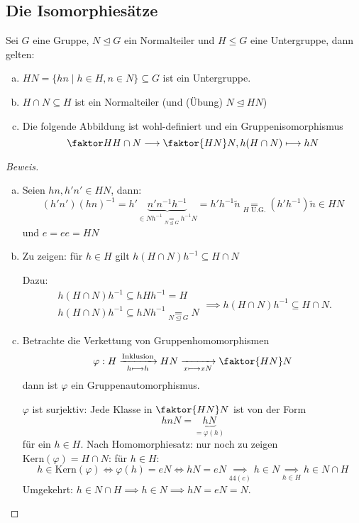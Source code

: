 \documentclass[a4paper]{report}
\begin{document}
\subsection*{Die Isomorphiesätze}
\begin{satz}
  Sei $G$ eine Gruppe, $N \trianglelefteq G$ ein Normalteiler und $H \le G$ eine Untergruppe, dann gelten:
  \begin{enumerate}[(a)]
    \item $HN = \{hn \mid h \in H, n \in N\} \subseteq G$ ist ein Untergruppe.
    \item $H \cap N \subseteq H$ ist ein Normalteiler (und (Übung) $N \trianglelefteq HN$)
    \item Die folgende Abbildung ist wohl-definiert und ein Gruppenisomorphismus $$\faktor H{H \cap N} \longrightarrow \faktor {HN}N, h(H\cap N) \longmapsto hN$$
  \end{enumerate}
\begin{proof}[Beweis]
\begin{enumerate}[(a)]
  \item Seien $hn, h'n' \in HN$, dann:
        $$(h'n')(hn)^{-1}=h'\underbrace{n'n^{-1}h^{-1}}_{\in Nh^{-1} \underset{N \trianglelefteq G} = h^{-1}N} = h'h^{-1}\tilde n \underset{H \text{ U.G.}}= (h'h^{-1})\tilde n \in HN$$
        und $e = ee = HN$
  \item Zu zeigen: für $h \in H$ gilt $h(H \cap N)h^{-1} \subseteq H \cap N$

        Dazu:
        $$\begin{matrix}
            h (H \cap N)h^{-1} \subseteq hHh^{-1} = H \\
            h (H \cap N)h^{-1} \subseteq hNh^{-1} \underset{N \trianglelefteq G}= N
          \end{matrix} \implies h(H \cap N)h^{-1} \subseteq H \cap N.$$

  \item Betrachte die Verkettung von Gruppenhomomorphismen
        $$\varphi: H \xrightarrow[h \longmapsto h]{\text{Inklusion}} HN \xrightarrow[x \longmapsto xN]{} \faktor{HN}N$$
        dann ist $\varphi$ ein Gruppenautomorphismus.

        $\varphi$ ist surjektiv: Jede Klasse in $\faktor{HN}N$ ist von der Form $$hnN = \underbrace{hN}_{=\varphi(h)}$$
        für ein $h \in H$. Nach Homomorphiesatz: nur noch zu zeigen $\mathrm{Kern}(\varphi) = H \cap N$:
        für $h \in H$: $$h \in \mathrm{Kern}(\varphi) \iff \varphi(h) = eN \iff hN = eN \underset{44(c)}\implies h \in N \underset{h \in H}\implies h \in N \cap H$$
        Umgekehrt: $h \in N \cap H \implies h \in N \implies hN = eN = N$.
\end{enumerate}
\end{proof}
\end{satz}
\end{document}
